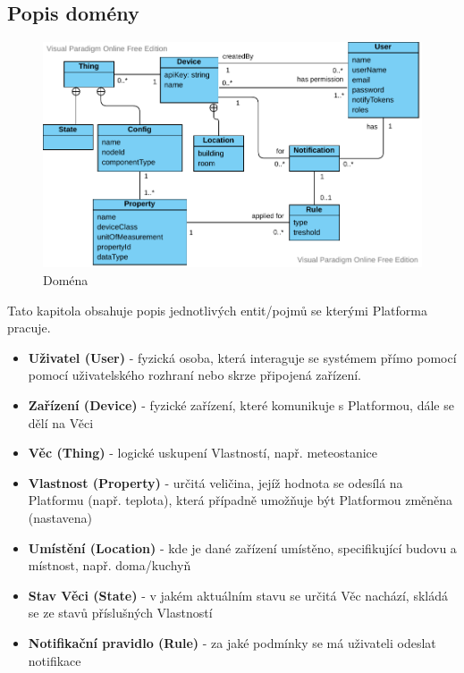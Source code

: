 \subsection{Popis domény} %
\begin{figure}[htbp]
    \centering
    \includegraphics[width=\textwidth]{img/domain.pdf}
    \caption{Doména}
\end{figure}
Tato kapitola obsahuje popis jednotlivých entit/pojmů se kterými Platforma pracuje.
\begin{itemize}
    \item \textbf{Uživatel (User)} - fyzická osoba, která interaguje se systémem přímo pomocí pomocí uživatelského rozhraní nebo skrze připojená zařízení.
    \item \textbf{Zařízení (Device)} - fyzické zařízení, které komunikuje s Platformou, dále se dělí na Věci
    \item \textbf{Věc (Thing)} - logické uskupení Vlastností, např. meteostanice
    \item \textbf{Vlastnost (Property)} - určitá veličina, jejíž hodnota se odesílá na Platformu (např. teplota), která případně umožňuje být Platformou změněna (nastavena)
    \item \textbf{Umístění (Location)} - kde je dané zařízení umístěno, specifikující budovu a místnost, např. doma/kuchyň
    \item \textbf{Stav Věci (State)} - v jakém aktuálním stavu se určitá Věc nachází, skládá se ze stavů příslušných Vlastností
    \item \textbf{Notifikační pravidlo (Rule)} - za jaké podmínky se má uživateli odeslat notifikace
\end{itemize}


